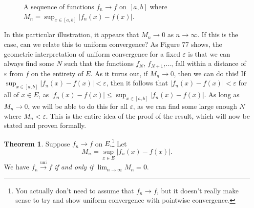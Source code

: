 \documentclass{article}
\newcommand{\R}{\mathbb{R}}
\newcommand{\uni}{\overset{\text{uni}}{\to}}
\theoremstyle{definition}
\newtheorem{theorem}{Theorem}[section]
\begin{document}
\begin{figure}[h!]
	\centering
	\caption{A sequence of functions $ f_n\to f $ on $ [a,b] $ where $ M_n=\sup_{x\in [a,b]}|f_n(x)-f(x)| $.}
\end{figure}
In this particular illustration, it appears that $ M_n\to 0 $ as $ n\to\infty $. If this is the case, can we relate this to uniform convergence? As Figure 77 shows, the geometric interpretation of uniform convergence for a fixed $ \varepsilon $ is that we can always find some $ N $ such that the functions $ f_N $, $ f_{N+1} $,$ \ldots $, fall within a distance of $ \varepsilon $ from $ f $ on the entirety of $ E $. As it turns out, if $ M_n\to 0 $, then we can do this! If $ \sup_{x\in [a,b]}|f_n(x)-f(x)|<\varepsilon $, then it follows that $ |f_n(x)-f(x)|<\varepsilon $ for all of $ x\in E $, as $ |f_n(x)-f(x)| \le \sup_{x\in [a,b]}|f_n(x)-f(x)| $. As long as $ M_n\to 0 $, we will be able to do this for all $ \varepsilon $, as we can find some large enough $ N $ where $ M_n<\varepsilon $. This is the entire idea of the proof of the result, which will now be stated and proven formally. 
\begin{theorem}
	Suppose $ f_n\to f $ on $ E $.\footnote{You actually don't need to assume that $ f_n\to f $, but it doesn't really make sense to try and show uniform convergence with pointwise convergence.} Let $$M_n=\sup_{x\in E}|f_n(x)-f(x)| .$$ We have $ f_n\uni f $ \textit{if and only if} $ \lim_{n\to\infty}M_n=0 $. 
\end{theorem}
\end{document}
